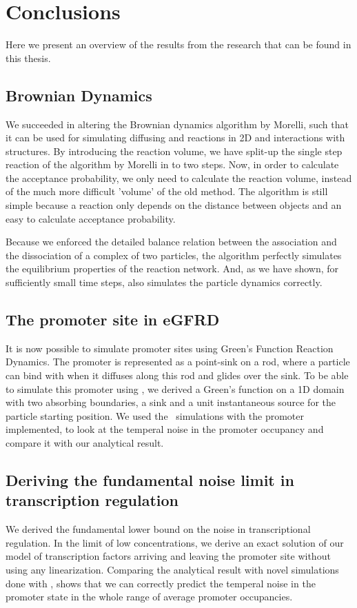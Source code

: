 \section{Conclusions}

Here we present an overview of the results from the research that can be found in this thesis.

\subsection{Brownian Dynamics}
We succeeded in altering the Brownian dynamics algorithm by Morelli, such that it can be used for simulating diffusing and reactions in 2D and interactions with structures. By introducing the reaction volume, we have split-up the single step reaction of the algorithm by Morelli in to two steps. Now, in order to calculate the acceptance probability, we only need to calculate the reaction volume, instead of the much more difficult 'volume' of the old method. The algorithm is still simple because a reaction only depends on the distance between objects and an easy to calculate acceptance probability. 

Because we enforced the detailed balance relation between the association and the dissociation of a complex of two particles, the algorithm perfectly simulates the equilibrium properties of the reaction network. And, as we have shown, for sufficiently small time steps, also simulates the particle dynamics correctly. 

\subsection{The promoter site in eGFRD}
It is now possible to simulate promoter sites using Green's Function Reaction Dynamics. The promoter is represented as a point-sink on a rod, where a particle can bind with when it diffuses along this rod and glides over the sink. To be able to simulate this promoter using \GFRD, we derived a Green's function on a 1D domain with two absorbing boundaries, a sink and a unit instantaneous source for the particle starting position. We used the \GFRD\, simulations with the promoter implemented, to look at the temperal noise in the promoter occupancy and compare it with our analytical result. 

\subsection{Deriving the fundamental noise limit in transcription regulation}
We derived the fundamental lower bound on the noise in transcriptional regulation. In the limit of low concentrations, we derive an exact solution of our model of transcription factors arriving and leaving the promoter site without using any linearization. Comparing the analytical result with novel simulations done with \GFRD, shows that we can correctly predict the temperal noise in the promoter state in the whole range of average promoter occupancies. 

